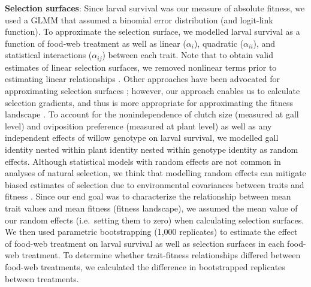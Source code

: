 \documentclass[11pt,]{article}
\begin{document}
\textbf{Selection surfaces}: Since larval survival was our measure of
absolute fitness, we used a GLMM that assumed a binomial error
distribution (and logit-link function). To approximate the selection
surface, we modelled larval survival as a function of food-web treatment
as well as linear (\(\alpha_i\)), quadratic (\(\alpha_{ii}\)), and
statistical interactions (\(\alpha_{ij}\)) between each trait. Note that
to obtain valid estimates of linear selection surfaces, we removed
nonlinear terms prior to estimating linear relationships
\citep{Lande1983}. Other approaches have been advocated for
approximating selection surfaces \citep{Schluter1988}; however, our
approach enables us to calculate selection gradients, and thus is more
appropriate for approximating the fitness landscape \citep{Arnold2003}.
To account for the nonindependence of clutch size (measured at gall
level) and oviposition preference (measured at plant level) as well as
any independent effects of willow genotype on larval survival, we
modelled gall identity nested within plant identity nested within
genotype identity as random effects. Although statistical models with
random effects are not common in analyses of natural selection, we think
that modelling random effects can mitigate biased estimates of selection
due to environmental covariances between traits and fitness
\citep{Rausher1992}. Since our end goal was to characterize the
relationship between mean trait values and mean fitness (fitness
landscape), we assumed the mean value of our random effects
(i.e.~setting them to zero) when calculating selection surfaces. We then
used parametric bootstrapping (1,000 replicates) to estimate the effect
of food-web treatment on larval survival as well as selection surfaces
in each food-web treatment. To determine whether trait-fitness
relationships differed between food-web treatments, we calculated the
difference in bootstrapped replicates between treatments.
\end{document}
